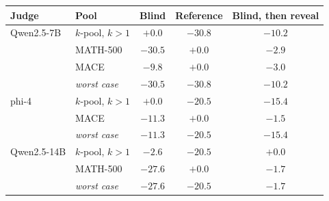 \begin{tabular}{llccc}
\toprule
Judge & Pool & Blind & Reference & Blind, then reveal \\
\midrule
Qwen2.5-7B & $k$-pool, $k{>}1$ & $+0.0$ & $-30.8$ & $-10.2$ \\
 & MATH-500 & $-30.5$ & $+0.0$ & $-2.9$ \\
 & \textsc{MACE} & $-9.8$ & $+0.0$ & $-3.0$ \\
 & \emph{worst case} & $\mathbf{-30.5}$ & $\mathbf{-30.8}$ & $\mathbf{-10.2}$ \\
\addlinespace
phi-4 & $k$-pool, $k{>}1$ & $+0.0$ & $-20.5$ & $-15.4$ \\
 & \textsc{MACE} & $-11.3$ & $+0.0$ & $-1.5$ \\
 & \emph{worst case} & $\mathbf{-11.3}$ & $\mathbf{-20.5}$ & $\mathbf{-15.4}$ \\
\addlinespace
Qwen2.5-14B & $k$-pool, $k{>}1$ & $-2.6$ & $-20.5$ & $+0.0$ \\
 & MATH-500 & $-27.6$ & $+0.0$ & $-1.7$ \\
 & \emph{worst case} & $\mathbf{-27.6}$ & $\mathbf{-20.5}$ & $\mathbf{-1.7}$ \\
\bottomrule
\end{tabular}
